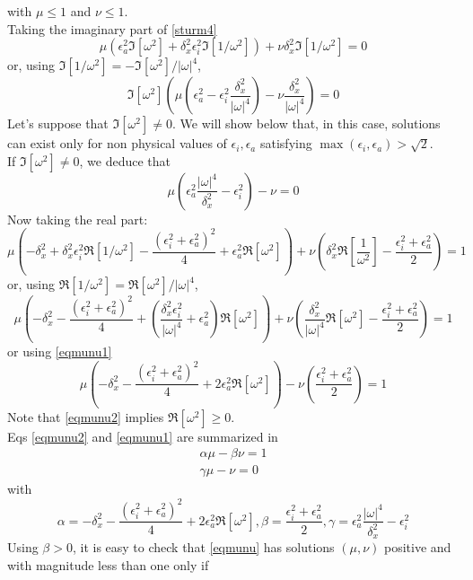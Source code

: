 with $\mu \le 1$ and $\nu \le 1$.\\
Taking the imaginary part of \ref{sturm4}
\[
\mu \left( \epsilon_a^2 \Im[\omega^2] +\delta_x^2 \epsilon_i^2 \Im[1/\omega^2]\right)+\nu \delta_x^2\Im[1/\omega^2]=0
\]
or, using $\Im[1/\omega^2]=-\Im[\omega^2]/|\omega|^4$,
\[
\Im[\omega^2]\left(\mu \left(\epsilon_a^2 -\epsilon_i^2 \frac{\delta_x^2}{|\omega|^4} \right) -\nu \frac{\delta_x^2}{|\omega|^4} \right)=0
\]
Let's suppose that $\Im[\omega^2] \ne 0$. We will show below that, in this case, solutions can exist only for non physical values of $\epsilon_i, \epsilon_a$ satisfying $\max(\epsilon_i,\epsilon_a) > \sqrt{2}$.\\
If $\Im[\omega^2] \ne 0$, we deduce that
\begin{equation}
\mu\left(\epsilon_a^2\frac{|\omega|^4}{\delta_x^2} -\epsilon_i^2\right)-\nu=0
\label{eqmunu1}
\end{equation}
Now taking the real part:
\[
\mu \left(-\delta_x^2+\delta_x^2\epsilon_i^2\Re[1/\omega^2]-\frac{(\epsilon_i^2+\epsilon_a^2)^2}{4}+\epsilon_a^2 \Re[\omega^2]\right)
+\nu \left(
\delta_x^2 \Re[\frac{1}{\omega^2}]-\frac{\epsilon_i^2+\epsilon_a^2}{2}
\right)=1
\]
or, using $\Re[1/\omega^2]=\Re[\omega^2]/|\omega|^4$,
\[
\mu \left(-\delta_x^2-\frac{(\epsilon_i^2+\epsilon_a^2)^2}{4}+(\frac{\delta_x^2\epsilon_i^2}{|\omega|^4}+\epsilon_a^2 )\Re[\omega^2]\right)
+\nu \left(
\frac{\delta_x^2}{|\omega|^4} \Re[\omega^2]-\frac{\epsilon_i^2+\epsilon_a^2}{2}
\right)=1
\]
or using \ref{eqmunu1}
\begin{equation}
\mu \left(-\delta_x^2-\frac{(\epsilon_i^2+\epsilon_a^2)^2}{4}+2\epsilon_a^2\Re[\omega^2] \right)
-\nu \left(
\frac{\epsilon_i^2+\epsilon_a^2}{2}
\right)=1
\label{eqmunu2}
\end{equation}
Note that \ref{eqmunu2} implies $\Re[\omega^2]\ge 0$.\\
Eqs \ref{eqmunu2} and \ref{eqmunu1} are summarized in 
\begin{equation}
\begin{array}{l}
\alpha \mu  - \beta \nu = 1\\
\gamma \mu - \nu=0
\end{array}
\label{eqmunu}
\end{equation}
with
\[
\alpha= -\delta_x^2-\frac{(\epsilon_i^2+\epsilon_a^2)^2}{4}+2\epsilon_a^2\Re[\omega^2], \beta = \frac{\epsilon_i^2+\epsilon_a^2}{2}, \gamma =  \epsilon_a^2\frac{|\omega|^4}{\delta_x^2} -\epsilon_i^2
\]
Using $\beta > 0$, it is easy to check that \ref{eqmunu} has solutions $(\mu,\nu)$ positive and with magnitude less than one only if
